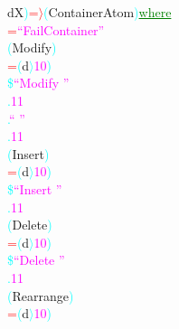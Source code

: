 {\rm{}dX}\textcolor{cyan}{)}\hsspace \textcolor{red}{=\ensuremath{\rangle}}\hsspace \textcolor{cyan}{(}{\rm{}ContainerAtom}\textcolor{cyan}{)}\hsspace \textcolor{green}{\underline{where}}\\\hsspace \textcolor{red}{=}\hsspace \textcolor{magenta}{``FailContainer''}\\\hsspace \textcolor{cyan}{(}{\rm{}Modify}\textcolor{cyan}{)}\\\hstab \hstab \textcolor{red}{=}\hsspace \textcolor{cyan}{(}{\rm{}d}\hsspace \textcolor{cyan}{\ensuremath{\rangle}}\hsspace \textcolor{magenta}{10}\textcolor{cyan}{)}\\\hstab \hstab \textcolor{cyan}{\$}\hsspace \textcolor{magenta}{``Modify ''}\\\hstab \hstab \textcolor{cyan}{.}\hsspace \textcolor{magenta}{11}\\\hstab \hstab \textcolor{cyan}{.}\hsspace \textcolor{magenta}{`` ''}\\\hstab \hstab \textcolor{cyan}{.}\hsspace \textcolor{magenta}{11}\\\hsspace \textcolor{cyan}{(}{\rm{}Insert}\textcolor{cyan}{)}\\\hstab \hstab \textcolor{red}{=}\hsspace \textcolor{cyan}{(}{\rm{}d}\hsspace \textcolor{cyan}{\ensuremath{\rangle}}\hsspace \textcolor{magenta}{10}\textcolor{cyan}{)}\\\hstab \hstab \textcolor{cyan}{\$}\hsspace \textcolor{magenta}{``Insert ''}\\\hstab \hstab \textcolor{cyan}{.}\hsspace \textcolor{magenta}{11}\\\hsspace \textcolor{cyan}{(}{\rm{}Delete}\textcolor{cyan}{)}\\\hstab \hstab \textcolor{red}{=}\hsspace \textcolor{cyan}{(}{\rm{}d}\hsspace \textcolor{cyan}{\ensuremath{\rangle}}\hsspace \textcolor{magenta}{10}\textcolor{cyan}{)}\\\hstab \hstab \textcolor{cyan}{\$}\hsspace \textcolor{magenta}{``Delete ''}\\\hstab \hstab \textcolor{cyan}{.}\hsspace \textcolor{magenta}{11}\\\hsspace \textcolor{cyan}{(}{\rm{}Rearrange}\textcolor{cyan}{)}\\\hstab \hstab \textcolor{red}{=}\hsspace \textcolor{cyan}{(}{\rm{}d}\hsspace \textcolor{cyan}{\ensuremath{\rangle}}\hsspace \textcolor{magenta}{10}\textcolor{cyan}{)}\\\hstab \hstab 